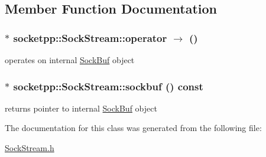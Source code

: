 \subsection{Member Function Documentation}
\hypertarget{classsocketpp_1_1SockStream_c5509fd039943c07c4506e42c75605e3}{
\subsubsection[{operator-$>$}]{$\ast$ socketpp::SockStream::operator $\rightarrow$  ()}}
\label{classsocketpp_1_1SockStream_c5509fd039943c07c4506e42c75605e3}


operates on internal \hyperlink{classsocketpp_1_1SockBuf}{SockBuf} object 

\hypertarget{classsocketpp_1_1SockStream_4b14a0ce8d640deb5f5bd64807c7b68d}{
\subsubsection[{sockbuf}]{$\ast$ socketpp::SockStream::sockbuf () const}}
\label{classsocketpp_1_1SockStream_4b14a0ce8d640deb5f5bd64807c7b68d}


returns pointer to internal \hyperlink{classsocketpp_1_1SockBuf}{SockBuf} object 



The documentation for this class was generated from the following file:\begin{CompactItemize}
\item 
\hyperlink{SockStream_8h}{SockStream.h}\end{CompactItemize}
